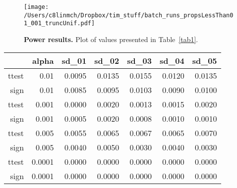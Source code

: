 \documentclass[11pt, letterpaper]{article}
\begin{document}
\begin{figure}
\begin{center}
\texttt{[image: /Users/c8linmch/Dropbox/tim\_stuff/batch\_runs\_propsLessThan01\_001\_truncUnif.pdf]}
\end{center}
\caption{\textbf{Power results.} Plot of values presented in Table~\ref{tab1}.}
\label{fig1}
\end{figure}

\begin{table}[ht]
\centering
\begin{tabular}{rr|rrrrr}
  \hline
 & alpha & sd\_01 & sd\_02 & sd\_03 & sd\_04 & sd\_05 \\ 
  \hline
ttest & 0.01 & 0.0095 & 0.0135 & 0.0155 & 0.0120 & 0.0135 \\ 
 sign & 0.01 & 0.0085 & 0.0095 & 0.0103 & 0.0090 & 0.0100 \\ \hline
ttest & 0.001 & 0.0000 & 0.0020 & 0.0013 & 0.0015 & 0.0020 \\ 
sign & 0.001 & 0.0005 & 0.0020 & 0.0008 & 0.0010 & 0.0010 \\ \hline
ttest & 0.005 & 0.0055 & 0.0065 & 0.0067 & 0.0065 & 0.0070 \\ 
sign & 0.005 & 0.0040 & 0.0050 & 0.0030 & 0.0040 & 0.0030 \\ \hline
ttest & 0.0001 & 0.0000 & 0.0000 & 0.0000 & 0.0000 & 0.0000 \\ 
sign & 0.0001 & 0.0000 & 0.0000 & 0.0000 & 0.0000 & 0.0000 \\ 
   \hline
\end{tabular}
\end{table}
\end{document}
